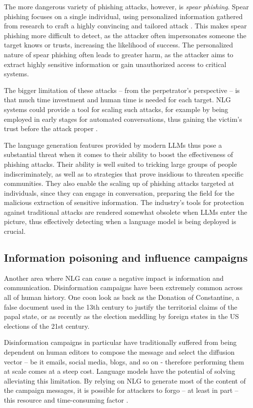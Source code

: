 The more dangerous variety of phishing attacks, however, is \emph{spear phishing}. Spear phishing focuses on a single individual, using personalized information gathered from research to craft a highly convincing and tailored attack \citep{parmar2012protecting}.
This makes spear phishing more difficult to detect, as the attacker often impersonates someone the target knows or trusts, increasing the likelihood of success.
The personalized nature of spear phishing often leads to greater harm, as the attacker aims to extract highly sensitive information or gain unauthorized access to critical systems.

The bigger limitation of these attacks -- from the perpetrator's perspective -- is that much time investment and human time is needed for each target.
NLG systems could provide a tool for scaling such attacks, for example by being employed in early stages for automated conversations, thus gaining the victim's trust before the attack proper \citep{alkhalil2021phishing}.

The language generation features provided by modern LLMs thus pose a substantial threat when it comes to their ability to boost the effectiveness of phishing attacks.
Their ability is well suited to tricking large groups of people indiscriminately, as well as to strategies that prove insidious to threaten specific communities.
They also enable the scaling up of phishing attacks targeted at individuals, since they can engage in conversation, preparing the field for the malicious extraction of sensitive information.
The industry's tools for protection against traditional attacks are rendered somewhat obsolete when LLMs enter the picture, thus effectively detecting when a language model is being deployed is crucial.

\subsection{Information poisoning and influence campaigns}

Another area where NLG can cause a negative impact is information and communication. Disinformation campaigns have been extremely common across all of human history.
One coon look as back as the Donation of Constantine, a false document used in the 13th century to justify the territorial claims of the papal state, or as recently as the election meddling by foreign states in the US elections of the 21st century.

Disinformation campaigns in particular have traditionally suffered from being dependent on human editors to compose the message and select the diffusion vector -- be it emails, social media, blogs, and so on - therefore performing them at scale comes at a steep cost. Language models have the potential of solving alleviating this limitation.
By relying on NLG to generate most of the content of the campaign messages, it is possible for attackers to forgo -- at least in part -- this resource and time-consuming factor \citep{shu2020mining}.


